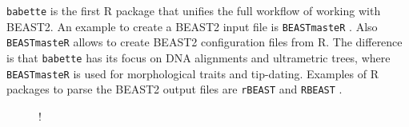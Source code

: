 \documentclass{article}
\begin{document}
\verb;babette; is the first R package that unifies the
full workflow of working with BEAST2. An
example to create a BEAST2 input file is 
\verb;BEASTmasteR; \cite{beastmaster}.
Also \verb;BEASTmasteR; allows 
to create BEAST2 configuration files from R. 
The difference is that \verb;babette; 
has its focus on DNA alignments and ultrametric trees, 
where \verb;BEASTmasteR; is used for 
morphological traits and tip-dating.
Examples of R packages to parse the BEAST2 output files
are \verb;rBEAST; \cite{rBEAST} and 
\verb;RBEAST; \cite{RBEAST}. 

\begin{figure}
  \centering
   {!} {
    }
\end{figure}
\end{document}
